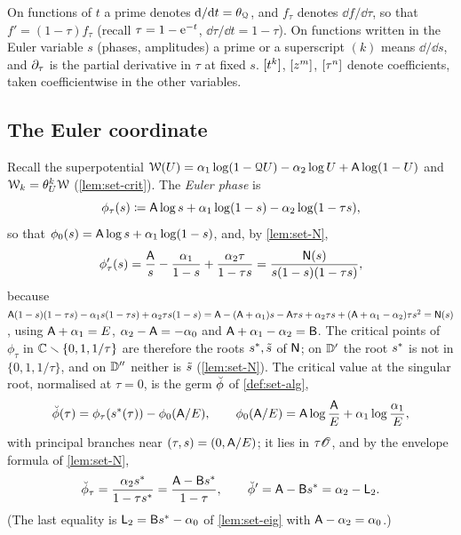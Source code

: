 On functions of $t$ a prime denotes $\mathrm{d}/\mathrm{d} t=\theta_{\mathcal{Q}}$, and $f_\tau$ denotes $\dd f/\dd\tau$, so that $f'=(1-\tau)f_\tau$ (recall $\tau=1-\mathrm{e}^{-t}$, $\dd\tau/\dd t=1-\tau$). On functions written in the Euler variable $s$ (phases, amplitudes) a prime or a superscript $(k)$ means $\dd/\dd s$, and $\partial_\tau$ is the partial derivative in $\tau$ at fixed $s$. $[t^k]$, $[z^m]$, $[\tau^n]$ denote coefficients, taken coefficientwise in the other variables.

\subsection{The Euler coordinate}
\label{sec:row-euler}

Recall the superpotential $\mathcal{W}(U)=\alpha_1\log(1-\mathcal{Q} U)-\alpha_2\log U+\mathsf{A}\log(1-U)$ and $\mathcal{W}_k=\theta_{U}^k\mathcal{W}$ (\cref{lem:set-crit}). The \emph{Euler phase} is
\begin{equation}
\label{eq:row-phase}
\phi_\tau(s)\coloneqq\mathsf{A}\log s+\alpha_1\log(1-s)-\alpha_2\log(1-\tau s),
\end{equation}
so that $\phi_0(s)=\mathsf{A}\log s+\alpha_1\log(1-s)$, and, by \cref{lem:set-N},
\begin{equation}
\label{eq:row-phaseder}
\phi_\tau'(s)=\frac{\mathsf{A}}{s}-\frac{\alpha_1}{1-s}+\frac{\alpha_2\tau}{1-\tau s}=\frac{\mathsf{N}(s)}{s(1-s)(1-\tau s)},
\end{equation}
because $\mathsf{A}(1-s)(1-\tau s)-\alpha_1s(1-\tau s)+\alpha_2\tau s(1-s)=\mathsf{A}-(\mathsf{A}+\alpha_1)s-\mathsf{A}\tau s+\alpha_2\tau s+(\mathsf{A}+\alpha_1-\alpha_2)\tau s^2=\mathsf{N}(s)$, using $\mathsf{A}+\alpha_1=E$, $\alpha_2-\mathsf{A}=-\alpha_0$ and $\mathsf{A}+\alpha_1-\alpha_2=\mathsf{B}$. The critical points of $\phi_\tau$ in $\mathbb{C}\smallsetminus\{0,1,1/\tau\}$ are therefore the roots $s^{\ast},\tilde{s}$ of $\mathsf{N}$; on $\mathbb{D}'$ the root $s^{\ast}$ is not in $\{0,1,1/\tau\}$, and on $\mathbb{D}''$ neither is $\tilde{s}$ (\cref{lem:set-N}). The critical value at the singular root, normalised at $\tau=0$, is the germ $\breve{\phi}$ of \cref{def:set-alg},
\begin{equation}
\label{eq:row-dphi}
\breve{\phi}(\tau)=\phi_\tau(s^{\ast}(\tau))-\phi_0(\mathsf{A}/E),\qquad \phi_0(\mathsf{A}/E)=\mathsf{A}\log\frac{\mathsf{A}}{E}+\alpha_1\log\frac{\alpha_1}{E},
\end{equation}
with principal branches near $(\tau,s)=(0,\mathsf{A}/E)$; it lies in $\tau\mathscr{O}$, and by the envelope formula of \cref{lem:set-N},
\begin{equation}
\label{eq:row-dphider}
\breve{\phi}_\tau=\frac{\alpha_2s^{\ast}}{1-\tau s^{\ast}}=\frac{\mathsf{A}-\mathsf{B}s^{\ast}}{1-\tau},\qquad \breve{\phi}'=\mathsf{A}-\mathsf{B}s^{\ast}=\alpha_2-\mathsf{L}_2 .
\end{equation}
(The last equality is $\mathsf{L}_2=\mathsf{B}s^{\ast}-\alpha_0$ of \cref{lem:set-eig} with $\mathsf{A}-\alpha_2=\alpha_0$.)

